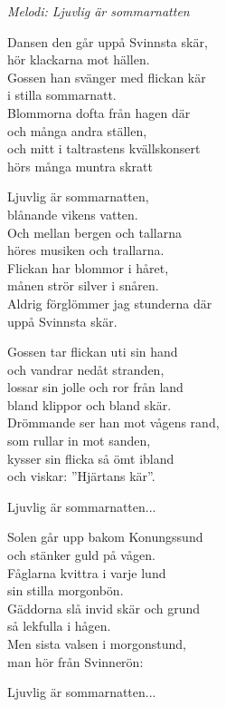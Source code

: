 {\footnotesize\textit{Melodi: Ljuvlig är sommarnatten}}\par
\vspace{10pt}
Dansen den går uppå Svinnsta skär,\\
hör klackarna mot hällen.\\
Gossen han svänger med flickan kär\\
i stilla sommarnatt.\\
Blommorna dofta från hagen där\\
och många andra ställen,\\
och mitt i taltrastens kvällskonsert\\
hörs många muntra skratt\par
\vspace{10pt}
Ljuvlig är sommarnatten,\\
blånande vikens vatten.\\
Och mellan bergen och tallarna\\
höres musiken och trallarna.\\
Flickan har blommor i håret,\\
månen strör silver i snåren.\\
Aldrig förglömmer jag stunderna där\\
uppå Svinnsta skär.\par
\vspace{10pt}
Gossen tar flickan uti sin hand\\
och vandrar nedåt stranden,\\
lossar sin jolle och ror från land\\
bland klippor och bland skär.\\
Drömmande ser han mot vågens rand,\\
som rullar in mot sanden,\\
kysser sin flicka så ömt ibland\\
och viskar: ''Hjärtans kär''.\par
\vspace{10pt}
Ljuvlig är sommarnatten...\par
\vspace{10pt}
Solen går upp bakom Konungssund\\
och stänker guld på vågen.\\
Fåglarna kvittra i varje lund\\
sin stilla morgonbön.\\
Gäddorna slå invid skär och grund\\
så lekfulla i hågen.\\
Men sista valsen i morgonstund,\\
man hör från Svinnerön:\par
\vspace{10pt}
Ljuvlig är sommarnatten...
